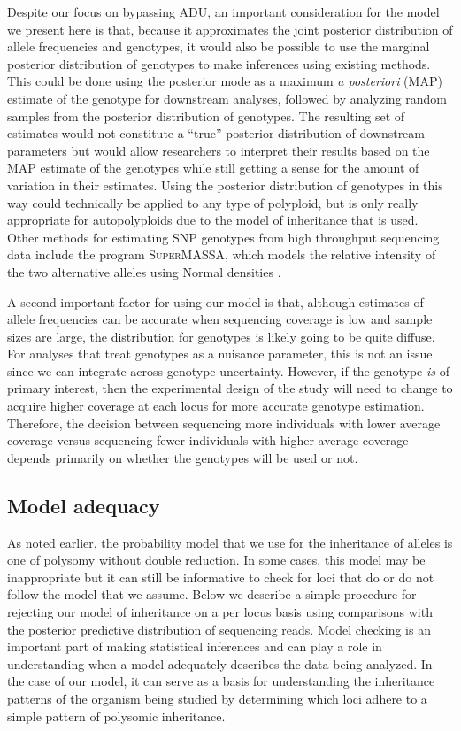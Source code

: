 \documentclass[11pt,english,letterpaper,oneside]{article}
\begin{document}
Despite our focus on bypassing ADU, an important consideration for the model we present here is that, because it approximates the joint posterior distribution of allele frequencies and genotypes, it would also be possible to use the marginal posterior distribution of genotypes to make inferences using existing methods. This could be done using the posterior mode as a maximum \textit{a posteriori} (MAP) estimate of the genotype for downstream analyses, followed by analyzing random samples from the posterior distribution of genotypes. The resulting set of estimates would not constitute a ``true'' posterior distribution of downstream parameters but would allow researchers to interpret their results based on the MAP estimate of the genotypes while still getting a sense for the amount of variation in their estimates. Using the posterior distribution of genotypes in this way could technically be applied to any type of polyploid, but is only really appropriate for autopolyploids due to the model of inheritance that is used. Other methods for estimating SNP genotypes from high throughput sequencing data include the program \textsc{SuperMASSA}, which models the relative intensity of the two alternative alleles using Normal densities \citep{serang2012supermassa}. 
\medskip

A second important factor for using our model is that, although estimates of allele frequencies can be accurate when sequencing coverage is low and sample sizes are large, the distribution for genotypes is likely going to be quite diffuse. For analyses that treat genotypes as a nuisance parameter, this is not an issue since we can integrate across genotype uncertainty. However, if the genotype \textit{is} of primary interest, then the experimental design of the study will need to change to acquire higher coverage at each locus for more accurate genotype estimation. Therefore, the decision between sequencing more individuals with lower average coverage versus sequencing fewer individuals with higher average coverage depends primarily on whether the genotypes will be used or not.

\medskip
\subsection*{Model adequacy}
\medskip

As noted earlier, the probability model that we use for the inheritance of alleles is one of polysomy without double reduction. In some cases, this model may be inappropriate but it can still be informative to check for loci that do or do not follow the model that we assume. Below we describe a simple procedure for rejecting our model of inheritance on a per locus basis using comparisons with the posterior predictive distribution of sequencing reads. Model checking is an important part of making statistical inferences and can play a role in understanding when a model adequately describes the data being analyzed. In the case of our model, it can serve as a basis for understanding the inheritance patterns of the organism being studied by determining which loci adhere to a simple pattern of polysomic inheritance. 
\medskip
\end{document}
